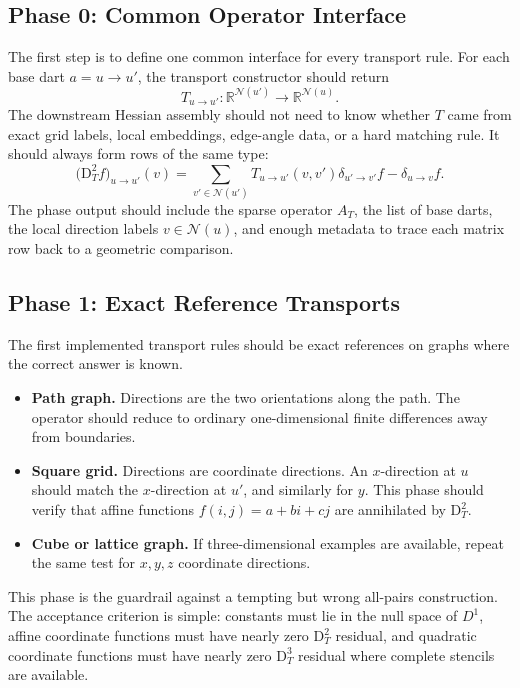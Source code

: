 \documentclass[11pt]{article}
\newcommand{\R}{\mathbb R}
\newcommand{\N}{\mathcal N}
\newcommand{\D}{\mathrm D}
\begin{document}
\subsection{Phase 0: Common Operator Interface}

The first step is to define one common interface for every transport rule.  For
each base dart \(a=u\to u'\), the transport constructor should return
\[
  T_{u\to u'}:\R^{\N(u')}\to\R^{\N(u)}.
\]
The downstream Hessian assembly should not need to know whether \(T\) came
from exact grid labels, local embeddings, edge-angle data, or a hard matching
rule.  It should always form rows of the same type:
\[
  \bigl(\D_T^2 f\bigr)_{u\to u'}(v)
  =
  \sum_{v'\in\N(u')}T_{u\to u'}(v,v')\delta_{u'\to v'}f
  -
  \delta_{u\to v}f.
\]
The phase output should include the sparse operator \(A_T\), the list of base
darts, the local direction labels \(v\in\N(u)\), and enough metadata to trace
each matrix row back to a geometric comparison.

\subsection{Phase 1: Exact Reference Transports}

The first implemented transport rules should be exact references on graphs
where the correct answer is known.

\begin{itemize}[leftmargin=*]
  \item \textbf{Path graph.}  Directions are the two orientations along the
  path.  The operator should reduce to ordinary one-dimensional finite
  differences away from boundaries.
  \item \textbf{Square grid.}  Directions are coordinate directions.  An
  \(x\)-direction at \(u\) should match the \(x\)-direction at \(u'\), and
  similarly for \(y\).  This phase should verify that affine functions
  \(f(i,j)=a+bi+cj\) are annihilated by \(\D_T^2\).
  \item \textbf{Cube or lattice graph.}  If three-dimensional examples are
  available, repeat the same test for \(x,y,z\) coordinate directions.
\end{itemize}

This phase is the guardrail against a tempting but wrong all-pairs
construction.  The acceptance criterion is simple: constants must lie in the
null space of \(D^1\), affine coordinate functions must have nearly zero
\(\D_T^2\) residual, and quadratic coordinate functions must have nearly zero
\(\D_T^3\) residual where complete stencils are available.
\end{document}
